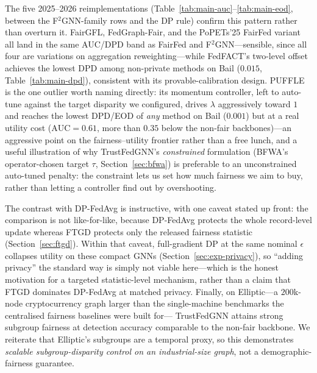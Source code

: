 \documentclass[pdflatex,sn-mathphys-num]{sn-jnl}
\theoremstyle{thmstyleone}%
\theoremstyle{thmstyletwo}%
\theoremstyle{thmstylethree}%
\begin{document}
The five 2025--2026 reimplementations (Table~\ref{tab:main-auc}--\ref{tab:main-eod},
between the F$^2$GNN-family rows and the DP rule) confirm this pattern rather
than overturn it. FairGFL, FedGraph-Fair, and the PoPETs'25 FairFed variant
all land in the same AUC/DPD band as FairFed and F$^2$GNN---sensible, since
all four are variations on aggregation reweighting---while FedFACT's two-level
offset achieves the lowest DPD among non-private methods on Bail ($0.015$,
Table~\ref{tab:main-dpd}), consistent with its provable-calibration design.
PUFFLE is the one outlier worth naming directly: its momentum controller, left
to auto-tune against the target disparity we configured, drives $\lambda$
aggressively toward $1$ and reaches the lowest DPD/EOD of \emph{any} method on
Bail ($0.001$) but at a real utility cost ($\mathrm{AUC}{=}0.61$, more than
$0.35$ below the non-fair backbones)---an aggressive point on the
fairness--utility frontier rather than a free lunch, and a useful illustration
of why TrustFedGNN's \emph{constrained} formulation (BFWA's operator-chosen
target $\tau$, Section~\ref{sec:bfwa}) is preferable to an unconstrained
auto-tuned penalty: the constraint lets us set how much fairness we aim to buy,
rather than letting a controller find out by overshooting.

The contrast with DP-FedAvg is instructive, with one caveat stated up front: the
comparison is not like-for-like, because DP-FedAvg protects the whole
record-level update whereas FTGD protects only the released fairness statistic
(Section~\ref{sec:ftgd}). Within that caveat, full-gradient DP at the same
nominal $\epsilon$ collapses utility on these compact GNNs
(Section~\ref{sec:exp-privacy}), so ``adding privacy'' the standard way is simply
not viable here---which is the honest motivation for a targeted statistic-level
mechanism, rather than a claim that FTGD dominates DP-FedAvg at matched privacy.
Finally, on Elliptic---a $200$k-node cryptocurrency graph larger than the
single-machine benchmarks the centralised fairness baselines were built for---
TrustFedGNN attains strong subgroup fairness at detection accuracy comparable to
the non-fair backbone. We reiterate that Elliptic's subgroups are a temporal
proxy, so this demonstrates \emph{scalable subgroup-disparity control on an
industrial-size graph}, not a demographic-fairness guarantee.

\begin{table}[t]\centering\small
\caption{Utility (AUC-ROC, higher is better). Mean\,$\pm$\,std over seeds:
\textbf{10} on the small/high-variance German, \textbf{5} on Bail and Pokec, and
2--3 on the larger Credit/Elliptic (see Table~\ref{tab:significance} for paired
tests). Best per column in bold. TrustFedGNN is the only method that is
fair \emph{and} private (methods above the rule are non-private).
$^{\ast}$FaVGNN is a horizontal adaptation of a vertical-FL method.
FairGFL/FedGraph-Fair/PUFFLE/FedFACT/PoPETs'25 are 2025--2026 reimplementations
with approximated fidelity (Appendix~\ref{app:baselines}).}
\label{tab:main-auc}
{\footnotesize\setlength{\tabcolsep}{3pt}}
\end{table}
\end{document}
